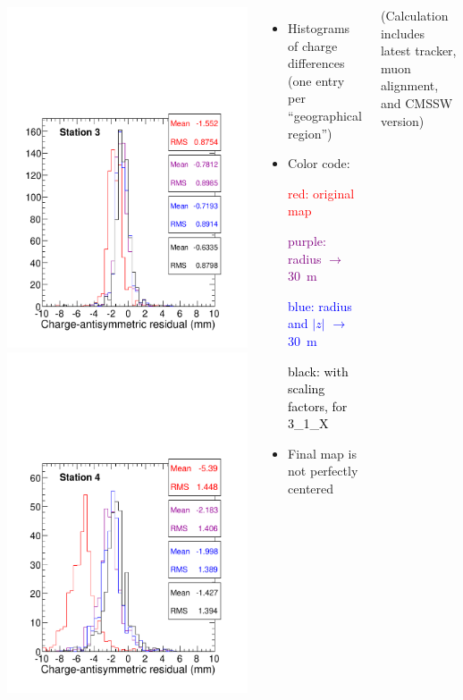 \documentclass[compress]{beamer}
\begin{document}
\begin{frame}
\begin{columns}
\includegraphics[width=0.5\linewidth]{station3_ptcut40.pdf}
\includegraphics[width=0.5\linewidth]{station4_ptcut40.pdf}

\scriptsize
\begin{itemize}
\item Histograms of charge differences (one entry per ``geographical region'')
\item Color code:

\textcolor{red}{red: original map}

\textcolor{purple}{purple: radius $\to$ 30~m}

\textcolor{blue}{blue: radius and $|z|$ $\to$ 30~m}

\textcolor{black}{black: with scaling factors, for 3\_1\_X}

\item Final map is not perfectly centered
\end{itemize}

\vspace{0.5 cm}
\tiny (Calculation includes latest tracker, muon alignment, and CMSSW version)
\end{columns}
\end{frame}
\end{document}
